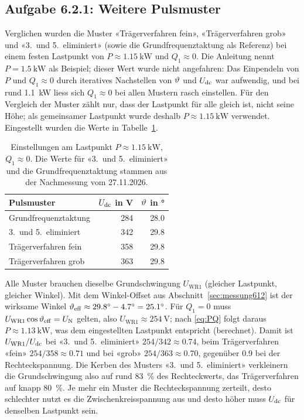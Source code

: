 \subsection{Aufgabe 6.2.1: Weitere Pulsmuster}
\label{sec:messung621}

Verglichen wurden die Muster «Trägerverfahren fein», «Trägerverfahren grob» und «3.\ und 5.\ eliminiert» (sowie die Grundfrequenztaktung als Referenz) bei einem festen Lastpunkt von $P\approx\SI{1.15}{\kilo\watt}$ und $Q_1\approx0$. Die Anleitung nennt $P=\SI{1.5}{\kilo\watt}$ als Beispiel; dieser Wert wurde nicht angefahren: Das Einpendeln von $P$ und $Q_1\approx0$ durch iteratives Nachstellen von $\vartheta$ und $U_{\mathrm{dc}}$ war aufwendig, und bei rund \SI{1.1}{\kilo\watt} liess sich $Q_1\approx0$ bei allen Mustern rasch einstellen. Für den Vergleich der Muster zählt nur, dass der Lastpunkt für alle gleich ist, nicht seine Höhe; als gemeinsamer Lastpunkt wurde deshalb $P\approx\SI{1.15}{\kilo\watt}$ verwendet. Eingestellt wurden die Werte in Tabelle~\ref{tab:621_einst}.

\begin{table}[htbp]
  \centering
  \caption{Einstellungen am Lastpunkt $P\approx\SI{1.15}{\kilo\watt}$, $Q_1\approx0$. Die Werte für «3.\ und 5.\ eliminiert» und die Grundfrequenztaktung stammen aus der Nachmessung vom 27.11.2026.}
  \label{tab:621_einst}
  \begin{tabular}{@{}lrr@{}}
    \toprule
    Pulsmuster & $U_{\mathrm{dc}}$ in V & $\vartheta$ in \si{\degree} \\
    \midrule
    Grundfrequenztaktung & 284 & 28.0 \\
    3.\ und 5.\ eliminiert & 342 & 29.8 \\
    Trägerverfahren fein & 358 & 29.8 \\
    Trägerverfahren grob & 363 & 29.8 \\
    \bottomrule
  \end{tabular}
\end{table}

Alle Muster brauchen dieselbe Grundschwingung $U_{\mathrm{WR1}}$ (gleicher Lastpunkt, gleicher Winkel). Mit dem Winkel-Offset aus Abschnitt~\ref{sec:messung612} ist der wirksame Winkel $\vartheta_{\mathrm{eff}}\approx\SI{29.8}{\degree}-\SI{4.7}{\degree}=\SI{25.1}{\degree}$. Für $Q_1=0$ muss $U_{\mathrm{WR1}}\cos\vartheta_{\mathrm{eff}}=U_{\mathrm{N}}$ gelten, also $U_{\mathrm{WR1}}\approx\SI{254}{\volt}$; nach \eqref{eq:PQ} folgt daraus $P\approx\SI{1.13}{\kilo\watt}$, was dem eingestellten Lastpunkt entspricht (berechnet). Damit ist $U_{\mathrm{WR1}}/U_{\mathrm{dc}}$ bei «3.\ und 5.\ eliminiert» $254/342\approx0.74$, beim Trägerverfahren «fein» $254/358\approx0.71$ und bei «grob» $254/363\approx0.70$, gegenüber 0.9 bei der Rechteckspannung. Die Kerben des Musters «3.\ und 5.\ eliminiert» verkleinern die Grundschwingung also auf rund \SI{83}{\percent} des Rechteckwerts, das Trägerverfahren auf knapp \SI{80}{\percent}. Je mehr ein Muster die Rechteckspannung zerteilt, desto schlechter nutzt es die Zwischenkreisspannung aus und desto höher muss $U_{\mathrm{dc}}$ für denselben Lastpunkt sein.

